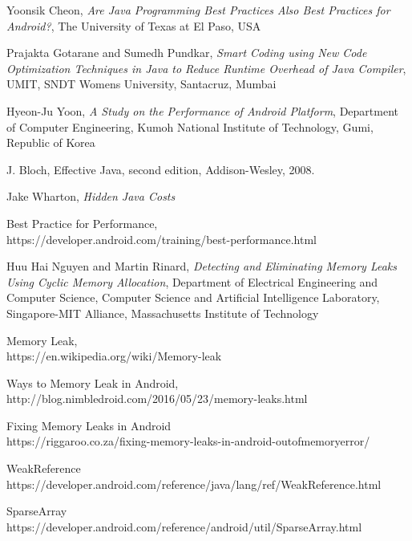 \documentclass[journal]{IEEEtran}
\begin{document}
\begin{thebibliography}{1}

\bibitem{}
Yoonsik Cheon, \emph{Are Java Programming Best Practices Also Best Practices for Android?}, The University of Texas at El Paso, USA

\bibitem{}
Prajakta Gotarane and Sumedh Pundkar, \emph{Smart Coding using New Code Optimization Techniques in Java to Reduce Runtime Overhead of Java Compiler}, UMIT, SNDT Womens University, Santacruz, Mumbai

\bibitem{}
Hyeon-Ju Yoon, \emph{A Study on the Performance of Android Platform}, Department of Computer Engineering, Kumoh National Institute of Technology, Gumi, Republic of Korea 

\bibitem{}
J. Bloch, Effective Java, second edition, Addison-Wesley, 2008.

\bibitem{}
Jake Wharton, \emph{Hidden Java Costs}

\bibitem{}
Best Practice for Performance,\\
https://developer.android.com/training/best-performance.html 

\bibitem{}
Huu Hai Nguyen and Martin Rinard, \emph{Detecting and Eliminating Memory Leaks Using Cyclic Memory Allocation}, Department of Electrical Engineering and Computer Science, 
Computer Science and Artificial Intelligence Laboratory, 
Singapore-MIT Alliance, 
Massachusetts Institute of Technology

Memory Leak,\\
https://en.wikipedia.org/wiki/Memory-leak

Ways to Memory Leak in Android,\\
http://blog.nimbledroid.com/2016/05/23/memory-leaks.html

Fixing Memory Leaks in Android\\
https://riggaroo.co.za/fixing-memory-leaks-in-android-outofmemoryerror/

WeakReference\\
https://developer.android.com/reference/java/lang/ref/WeakReference.html

SparseArray\\
https://developer.android.com/reference/android/util/SparseArray.html

\end{thebibliography}
\end{document}
